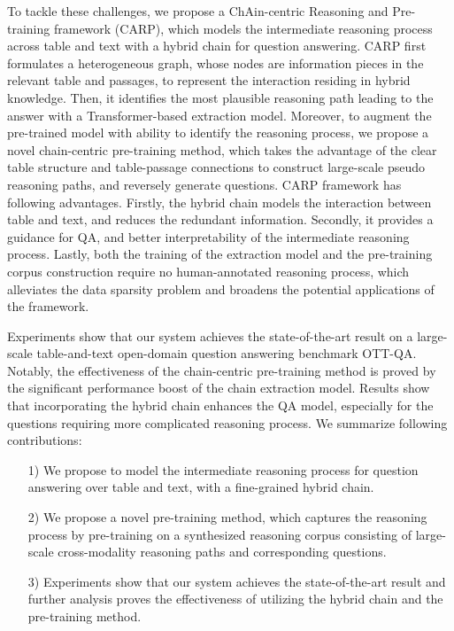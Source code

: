 \documentclass[11pt]{article}
\begin{document}
	To tackle these challenges, we propose a ChAin-centric Reasoning and Pre-training framework (CARP), which models the intermediate reasoning process across table and text with a hybrid chain for question answering. 
	CARP first formulates a heterogeneous graph, whose nodes are information pieces in the relevant table and passages, to represent the interaction residing in hybrid knowledge. 
	Then, it identifies the most plausible reasoning path leading to the answer with a Transformer-based extraction model. 
	Moreover, to augment the pre-trained model with ability to identify the reasoning process, we propose a novel chain-centric pre-training method, which takes the advantage of the clear table structure and table-passage connections to construct large-scale pseudo reasoning paths, and reversely generate questions. 
	CARP framework has following advantages. 
	Firstly, the hybrid chain models the interaction between table and text, and reduces the redundant information.
	Secondly, it provides a guidance for QA, and better interpretability of the intermediate reasoning process.
	Lastly, both the training of the extraction model and the pre-training corpus construction require no human-annotated reasoning process, which alleviates the data sparsity problem and broadens the potential applications of the framework. 
	
	Experiments show that our system achieves the state-of-the-art result on a large-scale table-and-text open-domain question answering benchmark OTT-QA. 
Notably, the effectiveness of the chain-centric pre-training method is proved by the significant performance boost of the chain extraction model.
	Results show that incorporating the hybrid chain enhances the QA model, especially for the questions requiring more complicated reasoning process.
	We summarize following contributions:
	\begin{itemize}
		\item[1)] We propose to model the intermediate reasoning process for question answering over table and text, with a fine-grained hybrid chain.
\item [2)] We propose a novel pre-training method, which captures the reasoning process by pre-training on a synthesized reasoning corpus consisting of large-scale cross-modality reasoning paths and corresponding questions. 
\item [3)] Experiments show that our system achieves the state-of-the-art result and further analysis proves the effectiveness of utilizing the hybrid chain and the pre-training method.
	\end{itemize}
	\iffalse
\end{document}
